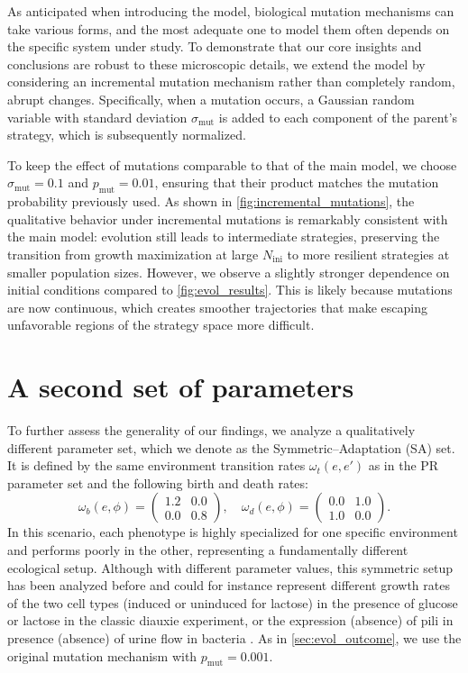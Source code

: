 \documentclass[aps,pre,reprint,10pt,superscriptaddress]{revtex4-2}
\begin{document}
As anticipated when introducing the model, biological mutation mechanisms can take various forms, and the most adequate one to model them often depends on the specific system under study. To demonstrate that our core insights and conclusions are robust to these microscopic details, we extend the model by considering an incremental mutation mechanism rather than completely random, abrupt changes. Specifically, when a mutation occurs, a Gaussian random variable with standard deviation $\sigma_\text{mut}$ is added to each component of the parent's strategy, which is subsequently normalized.

To keep the effect of mutations comparable to that of the main model, we choose $\sigma_\text{mut}=0.1$ and $p_\text{mut}=0.01$, ensuring that their product matches the mutation probability previously used. As shown in \cref{fig:incremental_mutations}, the qualitative behavior under incremental mutations is remarkably consistent with the main model: evolution still leads to intermediate strategies, preserving the transition from growth maximization at large $N_\text{ini}$ to more resilient strategies at smaller population sizes. However, we observe a slightly stronger dependence on initial conditions compared to \cref{fig:evol_results}. This is likely because mutations are now continuous, which creates smoother trajectories that make escaping unfavorable regions of the strategy space more difficult.

\section{A second set of parameters} \label{sec:symmetric_parameters}

To further assess the generality of our findings, we analyze a qualitatively different parameter set, which we denote as the Symmetric--Adaptation (SA) set. It is defined by the same environment transition rates $\omega_t(e,e')$ as in the PR parameter set and the following birth and death rates:
\begin{equation}
    \omega_b(e,\phi)=\begin{pmatrix}1.2&0.0\\0.0&0.8\end{pmatrix}, \quad \omega_d(e,\phi)=\begin{pmatrix}0.0&1.0\\1.0&0.0\end{pmatrix}.
\end{equation}
In this scenario, each phenotype is highly specialized for one specific environment and performs poorly in the other, representing a fundamentally different ecological setup. Although with different parameter values, this symmetric setup has been analyzed before \cite{beleteOptimalityAdaptationPhenotypically2015,kussellPhenotypicDiversityPopulation2005} and could for instance represent different growth rates of the two cell types (induced or uninduced for lactose) in the presence of glucose or lactose in the classic diauxie experiment, or the expression (absence) of pili in presence (absence) of urine flow in bacteria \cite{thattaiStochasticGeneExpression2004}. As in \cref{sec:evol_outcome}, we use the original mutation mechanism with $p_\text{mut}=0.001$.
\end{document}
